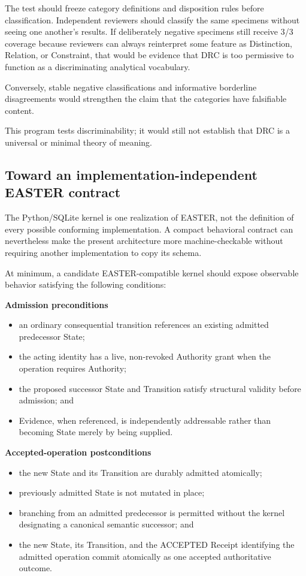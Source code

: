 \documentclass[11pt]{article}
\begin{document}
The test should freeze category definitions and disposition rules before classification. Independent reviewers should classify the same specimens without seeing one another's results. If deliberately negative specimens still receive 3/3 coverage because reviewers can always reinterpret some feature as Distinction, Relation, or Constraint, that would be evidence that DRC is too permissive to function as a discriminating analytical vocabulary.

Conversely, stable negative classifications and informative borderline disagreements would strengthen the claim that the categories have falsifiable content.

This program tests discriminability; it would still not establish that DRC is a universal or minimal theory of meaning.

\subsection{Toward an implementation-independent EASTER contract}

The Python/SQLite kernel is one realization of EASTER, not the definition of every possible conforming implementation. A compact behavioral contract can nevertheless make the present architecture more machine-checkable without requiring another implementation to copy its schema.

At minimum, a candidate EASTER-compatible kernel should expose observable behavior satisfying the following conditions:

\textbf{Admission preconditions}

\begin{itemize}
\item an ordinary consequential transition references an existing admitted predecessor State;
\item the acting identity has a live, non-revoked Authority grant when the operation requires Authority;
\item the proposed successor State and Transition satisfy structural validity before admission; and
\item Evidence, when referenced, is independently addressable rather than becoming State merely by being supplied.
\end{itemize}

\textbf{Accepted-operation postconditions}

\begin{itemize}
\item the new State and its Transition are durably admitted atomically;
\item previously admitted State is not mutated in place;
\item branching from an admitted predecessor is permitted without the kernel designating a canonical semantic successor; and
\item the new State, its Transition, and the ACCEPTED Receipt identifying the admitted operation commit atomically as one accepted authoritative outcome.
\end{itemize}
\end{document}
